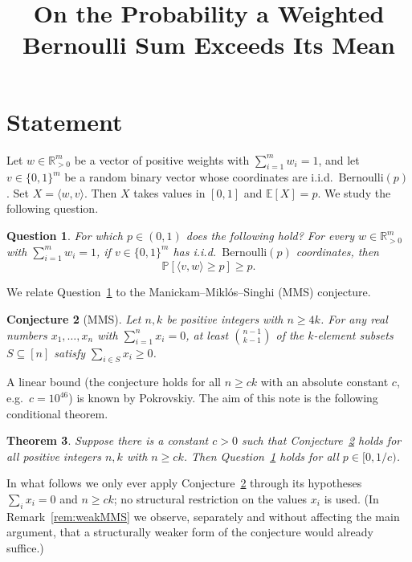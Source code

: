 \documentclass[11pt]{amsart}
\theoremstyle{plain}
\newtheorem{theorem}{Theorem}
\newtheorem{conjecture}[theorem]{Conjecture}
\newtheorem{question}[theorem]{Question}
\theoremstyle{definition}
\def\bE{\mathbb{E}}
\def\bR{\mathbb{R}}
\def\Pb{\mathbb{P}}
\begin{document}
\title{On the Probability a Weighted Bernoulli Sum Exceeds Its Mean}
\author{}
\date{}
\maketitle

\section{Statement}

Let $w\in\bR_{>0}^m$ be a vector of positive weights with $\sum_{i=1}^m w_i=1$, and
let $v\in\{0,1\}^m$ be a random binary vector whose coordinates are i.i.d.\
$\mathrm{Bernoulli}(p)$. Set $X=\langle w,v\rangle$. Then $X$ takes values in $[0,1]$
and $\bE[X]=p$. We study the following question.

\begin{question}\label{q:prob}
For which $p\in(0,1)$ does the following hold? For every $w\in\bR_{>0}^m$ with
$\sum_{i=1}^m w_i=1$, if $v\in\{0,1\}^m$ has i.i.d.\ $\mathrm{Bernoulli}(p)$
coordinates, then
\[
\Pb[\langle v,w\rangle\ge p]\ge p .
\]
\end{question}

We relate Question~\ref{q:prob} to the Manickam--Mikl\'os--Singhi (MMS) conjecture.

\begin{conjecture}[MMS]\label{conj:MMS}
Let $n,k$ be positive integers with $n\ge 4k$. For any real numbers
$x_1,\dots,x_n$ with $\sum_{i=1}^n x_i=0$, at least $\binom{n-1}{k-1}$ of the
$k$-element subsets $S\subseteq[n]$ satisfy $\sum_{i\in S}x_i\ge 0$.
\end{conjecture}

A linear bound (the conjecture holds for all $n\ge ck$ with an absolute constant
$c$, e.g.\ $c=10^{46}$) is known by Pokrovskiy. The aim of this note is the
following conditional theorem.

\begin{theorem}\label{thm:main}
Suppose there is a constant $c>0$ such that Conjecture~\ref{conj:MMS} holds for
all positive integers $n,k$ with $n\ge ck$. Then Question~\ref{q:prob} holds for
all $p\in[0,1/c)$.
\end{theorem}

In what follows we only ever apply Conjecture~\ref{conj:MMS} through its hypotheses
$\sum_i x_i=0$ and $n\ge ck$; no structural restriction on the values $x_i$ is
used. (In Remark~\ref{rem:weakMMS} we observe, separately and without affecting the
main argument, that a structurally weaker form of the conjecture would already
suffice.)
\end{document}
